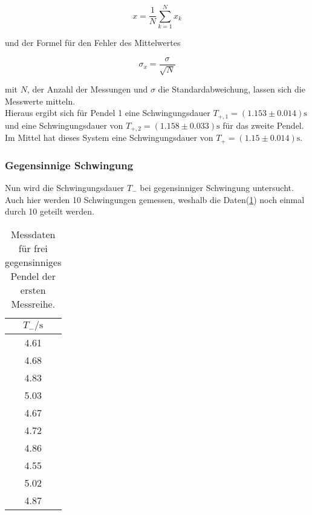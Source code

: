             \begin{equation}
                x = \frac{1}{N} \sum_{k=1}^{N} x_k
                \label{eqn:mittel}
            \end{equation}

            \noindent und der Formel für den Fehler des Mittelwertes

            \begin{equation}
                \sigma_{x} = \frac{\sigma}{\sqrt{N}}
                \label{eqn:mif}
            \end{equation}

            \noindent mit $N$, der Anzahl der Messungen und $\sigma$ die Standardabweichung, lassen sich die Messwerte mitteln.\\
            Hieraus ergibt sich für Pendel 1 eine 
            Schwingungsdauer $T_{+,1} = (1.153 \pm 0.014) \si{\second}$ und eine Schwingungsdauer von 
            $T_{+,2} = (1.158 \pm 0.033) \si{\second}$ für das zweite Pendel. Im Mittel hat dieses System eine Schwingungsdauer von 
            $T_+ = (1.15 \pm 0.014) \si{\second}$.

        \subsubsection{Gegensinnige Schwingung}
            
            \noindent Nun wird die Schwingungsdauer $T_{-}$ bei gegensinniger Schwingung untersucht. Auch hier werden 10 Schwingungen gemessen, 
            weshalb die Daten(\ref{tab:geg1}) noch einmal durch 10 geteilt werden.

            \begin{table}[ht]
                \centering
                \caption{Messdaten für frei gegensinniges Pendel der ersten Messreihe.}
                \label{tab:geg1}
                \begin{tabular}{c }
                 \toprule
                 $T_- / \si{\s}$ \\
                 \midrule
                 4.61  \\ 
                 4.68  \\ 
                 4.83  \\ 
                 5.03  \\ 
                 4.67  \\ 
                 4.72  \\ 
                 4.86  \\ 
                 4.55  \\ 
                 5.02  \\ 
                 4.87  \\ 
                \end{tabular}
            \end{table}

